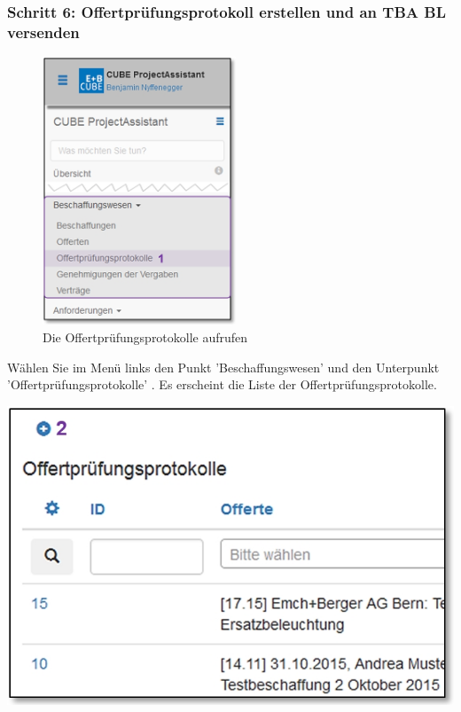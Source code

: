 \vspace{\baselineskip}

\pagebreak
\subsubsection{Schritt 6: Offertprüfungsprotokoll erstellen und an TBA BL versenden}

\begin{figure}
  \vspace{-30pt}      %
  \begin{center}
    \includegraphics[height=80mm]{../chapters/07_Beschaffungswesen/pictures/7-1-6_Menu_Besch_Offertp.jpg}
  \end{center}
  \vspace{-20pt}
  \caption{Die Offertprüfungsprotokolle aufrufen}
  \vspace{-10pt}
\end{figure}

Wählen Sie im Menü links den Punkt 'Beschaffungswesen' und den Unterpunkt 'Offertprüfungsprotokolle' . Es erscheint die Liste der Offertprüfungsprotokolle.

\begin{center}
\hspace{-15pt}   
\includegraphics[width=.75\linewidth]{../chapters/07_Beschaffungswesen/pictures/7-1-6_NeuesOffertPruefProtokoll.jpg}
\end{center}

